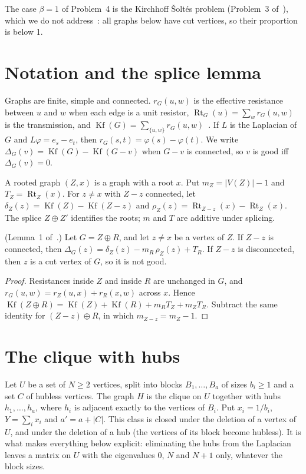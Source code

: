 \documentclass[11pt,a4paper]{report}
\newcommand*{\Kf}{\operatorname{Kf}}
\newcommand*{\Rt}{\operatorname{Rt}}
\begin{document}
The case \(\beta=1\) of Problem~4 is the Kirchhoff Šoltés problem (Problem~3 of~\autocite{GMD2026}), which we do not
address~\autocite{SiblingKS}: all graphs below have cut vertices, so their proportion is below 1.

\section{Notation and the splice lemma}\label{sec:splice}

Graphs are finite, simple and connected. \(r_G(u,w)\) is the effective resistance between \(u\) and \(w\) when each edge is
a unit resistor, \(\Rt_G(u)=\sum_wr_G(u,w)\) is the transmission, and
\(\Kf(G)=\sum_{\{u,w\}}r_G(u,w)\)~\autocite{KleinRandic1993,GutmanMohar1996}. If \(L\) is the Laplacian of \(G\) and
\(L\varphi=e_s-e_t\), then \(r_G(s,t)=\varphi(s)-\varphi(t)\). We write \(\Delta_G(v)=\Kf(G)-\Kf(G-v)\) when \(G-v\) is
connected, so \(v\) is good iff \(\Delta_G(v)=0\).

A rooted graph \((Z,x)\) is a graph with a root \(x\). Put \(m_Z=|V(Z)|-1\) and \(T_Z=\Rt_Z(x)\). For \(z\ne x\) with \(Z-z\)
connected, let \(\delta_Z(z)=\Kf(Z)-\Kf(Z-z)\) and \(\rho_Z(z)=\Rt_{Z-z}(x)-\Rt_Z(x)\). The splice \(Z\oplus Z'\) identifies
the roots; \(m\) and \(T\) are additive under splicing.

\begin{lemma}[note={splice lemma}]\label{lem:splice}
(Lemma~1 of~\autocite{ParentResult}.) Let \(G=Z\oplus R\), and let \(z\ne x\) be a vertex of \(Z\). If \(Z-z\) is connected, then
\(\Delta_G(z)=\delta_Z(z)-m_R\,\rho_Z(z)+T_R\). If \(Z-z\) is disconnected, then \(z\) is a cut vertex of \(G\), so it is not
good.
\end{lemma}
\begin{proof}
Resistances inside \(Z\) and inside \(R\) are unchanged in \(G\), and \(r_G(u,w)=r_Z(u,x)+r_R(x,w)\) across \(x\). Hence
\(\Kf(Z\oplus R)=\Kf(Z)+\Kf(R)+m_RT_Z+m_ZT_R\). Subtract the same identity for \((Z-z)\oplus R\), in which
\(m_{Z-z}=m_Z-1\).
\end{proof}

\section{The clique with hubs}\label{sec:hubs}

Let \(U\) be a set of \(N\ge2\) vertices, split into blocks \(B_1,\dots,B_a\) of sizes \(b_i\ge1\) and a set \(C\) of hubless
vertices. The graph \(H\) is the clique on \(U\) together with hubs \(h_1,\dots,h_a\), where \(h_i\) is adjacent exactly to the
vertices of \(B_i\). Put \(x_i=1/b_i\), \(Y=\sum_ix_i\) and \(a'=a+|C|\). This class is closed under the deletion of a vertex
of \(U\), and under the deletion of a hub (the vertices of its block become hubless). It is what makes everything below
explicit: eliminating the hubs from the Laplacian leaves a matrix on \(U\) with the eigenvalues \(0\), \(N\) and \(N+1\) only,
whatever the block sizes.
\end{document}
